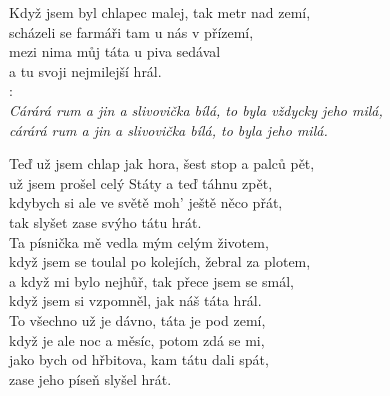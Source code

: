 
Když jsem byl chlapec malej, tak metr nad zemí,\\
scházeli se farmáři tam u nás v přízemí,\\
mezi nima můj táta u piva sedával\\
a tu svoji nejmilejší hrál.\\

\textregistered:\\
\emph{
Cárárá rum a jin a slivovička bílá, to byla vždycky jeho milá,\\
cárárá rum a jin a slivovička bílá, to byla jeho milá.\\}

Teď už jsem chlap jak hora, šest stop a palců pět,\\
už jsem prošel celý Státy a teď táhnu zpět,\\
kdybych si ale ve světě moh’ ještě něco přát,\\
tak slyšet zase svýho tátu hrát. \hspace{1cm} \textregistered\\

Ta písnička mě vedla mým celým životem,\\
když jsem se toulal po kolejích, žebral za plotem,\\
a když mi bylo nejhůř, tak přece jsem se smál,\\
když jsem si vzpomněl, jak náš táta hrál.\hspace{1cm} \textregistered\\

To všechno už je dávno, táta je pod zemí,\\
když je ale noc a měsíc, potom zdá se mi,\\
jako bych od hřbitova, kam tátu dali spát,\\
zase jeho píseň slyšel hrát.\hspace{1cm} \textregistered

\newpage
